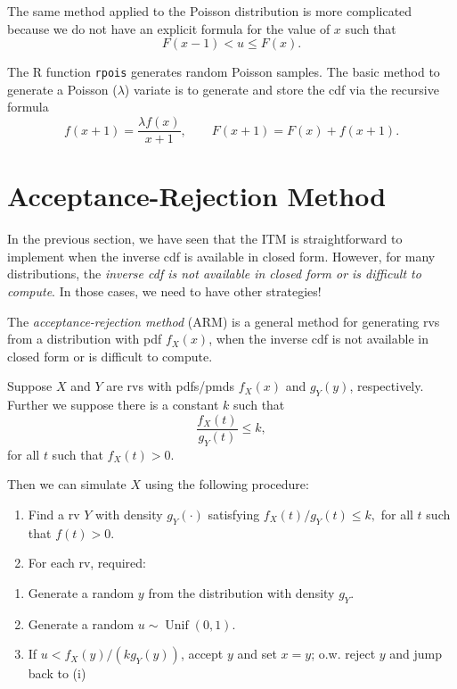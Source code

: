 \documentclass[
  letterpaper,
  DIV=11,
  numbers=noendperiod]{scrreprt}
\begin{document}
The same method applied to the Poisson distribution is more complicated
because we do not have an explicit formula for the value of \(x\) such
that \[
F(x-1) < u \leq F(x).
\]

The R function \texttt{rpois} generates random Poisson samples. The
basic method to generate a Poisson (\(\lambda\)) variate is to generate
and store the cdf via the recursive formula \[
f(x+1) = \frac{\lambda f(x)}{x+1}, 
\qquad 
F(x+1) = F(x) + f(x+1).
\]

\section{Acceptance-Rejection Method}\label{acceptance-rejection-method}

In the previous section, we have seen that the ITM is straightforward to
implement when the inverse cdf is available in closed form. However, for
many distributions, the \emph{inverse cdf is not available in closed
form or is difficult to compute}. In those cases, we need to have other
strategies!

The \emph{acceptance-rejection method} (ARM) is a general method for
generating rvs from a distribution with pdf \(f_X(x)\), when the inverse
cdf is not available in closed form or is difficult to compute.

Suppose \(X\) and \(Y\) are rvs with pdfs/pmds \(f_X(x)\) and
\(g_Y(y)\), respectively. Further we suppose there is a constant \(k\)
such that \[
\frac{f_X(t)}{g_Y(t)} \leq k,
\] for all \(t\) such that \(f_X(t) > 0\).

Then we can simulate \(X\) using the following procedure:

\begin{enumerate}
\def\labelenumi{\arabic{enumi}.}
\item
  Find a rv \(Y\) with density \(g_Y(\cdot)\) satisfying
  \(f_X(t)/g_Y(t) \le k,\) for all \(t\) such that \(f(t) > 0\).
\item
  For each rv, required:
\end{enumerate}

\begin{enumerate}
\def\labelenumi{(\roman{enumi})}
\item
  Generate a random \(y\) from the distribution with density \(g_Y\).
\item
  Generate a random \(u\sim\operatorname{Unif}(0,1)\).
\item
  If \(u < f_X(y)/(k g_Y(y))\), accept \(y\) and set \(x = y\); o.w.
  reject \(y\) and jump back to (i)
\end{enumerate}
\end{document}
